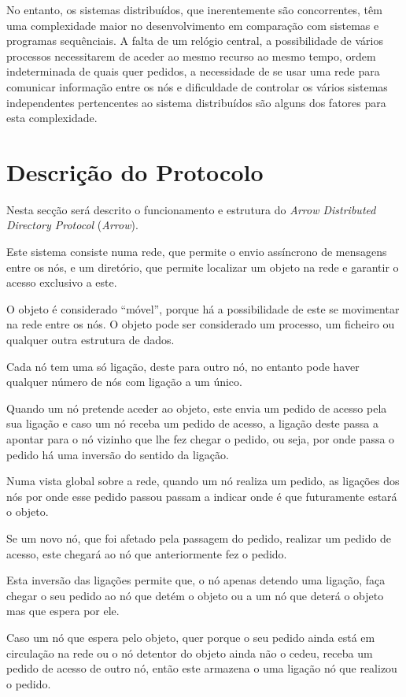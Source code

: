 No entanto, os sistemas distribuídos, que inerentemente são concorrentes, têm uma complexidade maior no desenvolvimento em comparação com sistemas e programas sequênciais.
A falta de um relógio central, a possibilidade de vários processos necessitarem de aceder ao mesmo recurso ao mesmo tempo, ordem indeterminada de quais quer pedidos, a necessidade de se usar uma rede para comunicar informação entre os nós e dificuldade de controlar os vários sistemas independentes pertencentes ao sistema distribuídos são alguns dos fatores para esta complexidade.


\section{Descrição do Protocolo}

Nesta secção será descrito o funcionamento e estrutura do \textit{Arrow Distributed Directory Protocol} (\emph{Arrow}). 

Este sistema consiste numa rede, que permite o envio assíncrono de mensagens entre os nós, e um diretório, que permite localizar um objeto na rede e garantir o acesso exclusivo a este. 

O objeto é considerado ``móvel'', porque há a possibilidade de este se movimentar na rede entre os nós.
O objeto pode ser considerado um processo, um ficheiro ou qualquer outra estrutura de dados.

Cada nó tem uma só ligação, deste para outro nó, no entanto pode haver qualquer número de nós com ligação a um único.

Quando um nó pretende aceder ao objeto, este envia um pedido de acesso pela sua ligação e
caso um nó receba um pedido de acesso, a ligação deste passa a apontar para o nó vizinho que lhe fez chegar o pedido, ou seja, por onde passa o pedido há uma inversão do sentido da ligação.

Numa vista global sobre a rede, quando um nó realiza um pedido, as ligações dos nós por onde esse pedido passou passam a indicar onde é que futuramente estará o objeto.

Se um novo nó, que foi afetado pela passagem do pedido, realizar um pedido de acesso, este chegará ao nó que anteriormente fez o pedido.

Esta inversão das ligações permite que, o nó apenas detendo uma ligação, faça chegar o seu pedido ao nó que detém o objeto ou a um nó que deterá o objeto mas que espera por ele.

Caso um nó que espera pelo objeto, quer porque o seu pedido ainda está em circulação na rede ou o nó detentor do objeto ainda não o cedeu, receba um pedido de acesso de outro nó, então este armazena o uma ligação nó que realizou o pedido.

